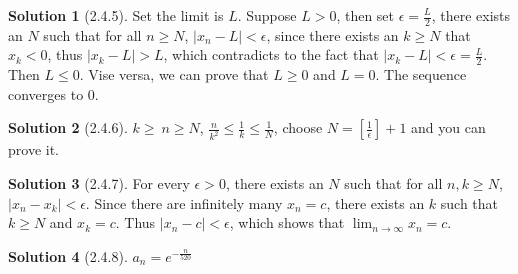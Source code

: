 \documentclass{article}
\theoremstyle{definition}
\newtheorem{sol}{Solution}[exe]
\begin{document}
\begin{sol}[2.4.5]
Set the limit is $L$. Suppose $L>0$, then set $\epsilon=\frac{L}{2}$, there exists an $N$ such that for all $n\geq N$, $|x_{n}-L|<\epsilon$, since there exists an $k\geq N$ that 
$x_{k}<0$, thus $|x_{k}-L|>L$, which contradicts to the fact that $|x_{k}-L|<\epsilon=\frac{L}{2}$. Then $L\leq0$. Vise versa, we can prove that $L\geq 0$ and $L=0$. The sequence converges to 0.

\end{sol}


\begin{sol}[2.4.6]
$k\geq\ n\geq N$, $\frac{n}{k^{2}}\leq\frac{1}{k}\leq\frac{1}{N}$, choose $N=[\frac{1}{\epsilon}]+1$ and you can prove it.
\end{sol}

\begin{sol}[2.4.7]

    For every $\epsilon>0$, there exists an $N$ such that for all $n,k\geq N$, $|x_{n}-x_{k}|<\epsilon$. Since there are infinitely many $x_{n}=c$, there exists an $k$ 
    such that $k\geq N$ and $x_{k}=c$. Thus $|x_{n}-c|<\epsilon$, which shows that $\lim_{n\to\infty} x_{n}=c$. 
    
\end{sol}

\begin{sol}[2.4.8]
    $a_{n}=e^{-\frac{n}{520}}$
\end{sol}
\end{document}
